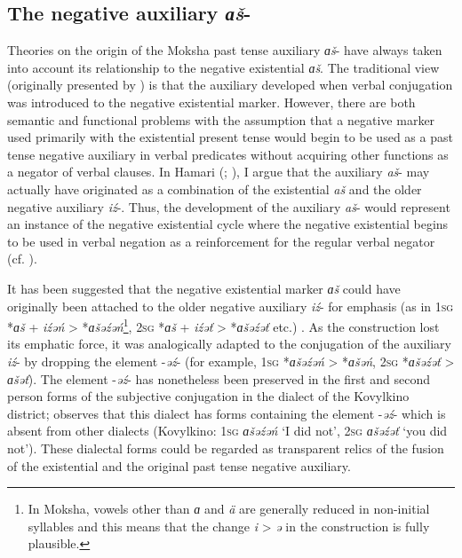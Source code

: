 \documentclass[output=paper,colorlinks,citecolor=brown,draft,draftmode]{langscibook}
\begin{document}
\subsection{The negative auxiliary \textit{ɑš}-}\label{sec:2:7.2}

Theories on the origin of the Moksha past tense auxiliary \textit{ɑš}- have always taken into account its relationship to the negative existential \textit{ɑš}. The traditional view (originally presented by \citealt[148]{Szinnyei1884}) is that the auxiliary developed when verbal conjugation was introduced to the negative existential marker. However, there are both semantic and functional problems with the assumption that a negative marker used primarily with the existential present tense would begin to be used as a past tense negative auxiliary in verbal predicates without acquiring other functions as a negator of verbal clauses. In Hamari (\citeyear[275]{Hamari2007}; \citeyear[480]{Hamari2013}), I argue that the auxiliary \textit{aš}- may actually have originated as a combination of the existential \textit{aš} and the older negative auxiliary \textit{iź}-. Thus, the development of the auxiliary \textit{aš}- would represent an instance of the negative existential cycle where the negative existential begins to be used in verbal negation as a reinforcement for the regular verbal negator (cf. \citealt[10--11]{Croft1991}).

It has been suggested that the negative existential marker \textit{ɑš}
could have originally been attached to the older negative auxiliary
\textit{iź}- for emphasis (as in \textsc{1sg} *\textit{ɑš} +
\textit{iźəń} > *\textit{ɑšəźəń}\footnote{In Moksha, vowels
other than \textit{ɑ} and \textit{ä} are generally reduced in non-initial
syllables and this means that the change \textit{i} > \textit{ə} in the
construction is fully plausible.}, \textsc{2sg} *\textit{ɑš} +
\textit{iźəť} > *\textit{ɑšəźəť} etc.) \parencites[273--275]{Hamari2007}[479--480]{Hamari2013}. As the construction lost its emphatic force, it was analogically adapted to the conjugation of the auxiliary \textit{iź}- by dropping the element -\textit{əź}- (for example, \textsc{1sg} *\textit{ɑšəźəń} > *\textit{ɑšəń}, \textsc{2sg} *\textit{ɑšəźəť} > \textit{ɑšəť}). The element -\textit{əź}- has nonetheless been preserved in the first and second person forms of the subjective conjugation in the dialect of the Kovylkino district; \citet[178]{Schemerova1972} observes that this dialect has forms containing the element -\textit{əź}- which is absent from other dialects (Kovylkino: 1\textsc{sg} \textit{ɑšəźəń} `I did not', 2\textsc{sg} \textit{ɑšəźəť} `you did not'). These dialectal forms could be regarded as transparent relics of the fusion of the existential and the original past tense negative auxiliary.
\end{document}
